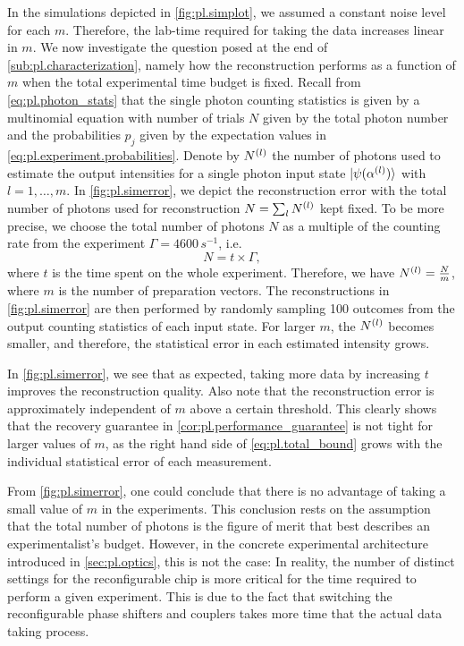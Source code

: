 In the simulations depicted in \cref{fig:pl.simplot}, we assumed a constant noise level for each $m$.
Therefore, the lab-time required for taking the data increases linear in $m$.
We now investigate the question posed at the end of \cref{sub:pl.characterization}, namely how the reconstruction performs as a function of $m$ when the total experimental time budget is fixed.
Recall from \cref{eq:pl.photon_stats} that the single photon counting statistics is given by a multinomial equation with number of trials $N$ given by the total photon number and the probabilities $p_j$ given by the expectation values in \cref{eq:pl.experiment.probabilities}.
Denote by $N^{(l)}$ the number of photons used to estimate the output intensities for a single photon input state $\ket{\psi(\alpha\ind{l})}$ with $l=1,\ldots,m$.
In \cref{fig:pl.simerror}, we depict the reconstruction error with the total number of photons used for reconstruction $N = \sum_l N^{(l)}$ kept fixed.
To be more precise, we choose the total number of photons $N$ as a multiple of the counting rate from the experiment $\Gamma = 4600\,s^{-1}$, i.e.
\[
  N = t \times \Gamma,
  \label{eq:pl.counts_from_time}
\]
where $t$ is the time spent on the whole experiment.
Therefore, we have $N^{(l)} = \frac{N}{m}$, where $m$ is the number of preparation vectors.
The reconstructions in \cref{fig:pl.simerror} are then performed by randomly sampling 100 outcomes from the output counting statistics of each input state.
For larger $m$, the $N^{(l)}$ becomes smaller, and therefore, the statistical error in each estimated intensity grows.

In \cref{fig:pl.simerror}, we see that as expected, taking more data by increasing $t$ improves the reconstruction quality.
Also note that the reconstruction error is approximately independent of $m$ above a certain threshold.
This clearly shows that the recovery guarantee in \cref{cor:pl.performance_guarantee} is not tight for larger values of $m$, as the right hand side of \cref{eq:pl.total_bound} grows with the individual statistical error of each measurement.

From \cref{fig:pl.simerror}, one could conclude that there is no advantage of taking a small value of $m$ in the experiments.
This conclusion rests on the assumption that the total number of photons is the figure of merit that best describes an experimentalist's budget.
However, in the concrete experimental architecture introduced in \cref{sec:pl.optics}, this is not the case:
In reality, the number of distinct settings for the reconfigurable chip is more critical for the time required to perform a given experiment.
This is due to the fact that switching the reconfigurable phase shifters and couplers takes more time that the actual data taking process.

